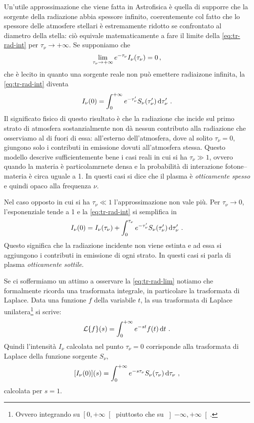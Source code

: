     Un'utile approssimazione che viene fatta in Astrofisica è quella di supporre che la sorgente della radiazione abbia spessore infinito, coerentemente col fatto che lo spessore delle atmosfere stellari è estremamente ridotto se confrontato al diametro della stella: ciò equivale matematicamente a fare il limite della \eqref{eq:tr-rad-int} per $\tau_\nu \to +\infty$. Se supponiamo che
    \begin{equation*}
        \lim_{\tau_\nu \to +\infty} e^{-\tau_\nu}I_{\nu}\pqty{\tau_\nu} = 0
        \mycomma
    \end{equation*}
    che è lecito in quanto una sorgente reale non può emettere radiaizone infinita, la \eqref{eq:tr-rad-int} diventa
    \begin{equation}
        \label{eq:tr-rad-lim}
        I_\nu\pqty{0} = \int_0^{+\infty} e^{-\tau_{\nu}'} S_{\nu}\pqty{\tau_{\nu}'} \dd{\tau_{\nu}'}
        \myperiod
    \end{equation}
    Il significato fisico di questo risultato è che la radiazione che incide sul primo strato di atmosfera sostanzialmente non dà nessun contributo alla radiazione che osserviamo al di fuori di essa: all'esterno dell'atmosfera, dove al solito $\tau_\nu = 0$, giungono solo i contributi in emissione dovuti all'atmosfera stessa. Questo modello descrive sufficientemente bene i casi reali in cui si ha $\tau_\nu \gg 1$, ovvero quando la materia è particolamrnete densa e la probabilità di interazione fotone--materia è circa uguale a \num{1}. In questi casi si dice che il plasma è \emph{otticamente spesso} e quindi opaco alla frequenza $\nu$.

    Nel caso opposto in cui si ha $\tau_\nu \ll 1$ l'approssimazione non vale più. Per $\tau_\nu \to 0$, l'esponenziale tende a \num{1} e la \eqref{eq:tr-rad-int} si semplifica in
    \begin{equation*}
        I_\nu\pqty{0} = I_{\nu}\pqty{\tau_\nu} + \int_0^{\tau_\nu} e^{-\tau_{\nu}'} S_{\nu}\pqty{\tau_{\nu}'} \dd{\tau_{\nu}'}
        \myperiod
    \end{equation*}
    Questo significa che la radiazione incidente non viene estinta e ad essa si aggiungono i contributi in emissione di ogni strato. In questi casi si parla di plasma \emph{otticamente sottile}.

    Se ci soffermiamo un attimo a osservare la \eqref{eq:tr-rad-lim} notiamo che formalmente ricorda una trasformata integrale, in particolare la trasformata di Laplace. Data una funzione $f$ della variabile $t$, la sua trasformata di Laplace unilatera\footnote{Ovvero integrando su $\left[0,+\infty\right[$ piuttosto che su $\left]-\infty,+\infty\right[$.} si scrive:
    \begin{equation*}
        \mcL\qty{f}\pqty{s} = \int_0^{+\infty} e^{-st} f\pqty{t} \dd{t}
        \myperiod
    \end{equation*}
    Quindi l'intensità $I_\nu$ calcolata nel punto $\tau_\nu = 0$ corrisponde alla trasformata di Laplace della funzione sorgente $S_\nu$,
    \begin{equation*}
        \bqty{I_{\nu}\pqty{0}}\pqty{s} = \int_0^{+\infty} e^{-s\tau_\nu} S_\nu\pqty{\tau_\nu} \dd{\tau_\nu}
        \mycomma
    \end{equation*}
    calcolata per $s = 1$.
